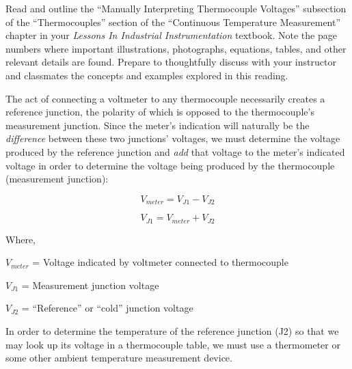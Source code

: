 

Read and outline the ``Manually Interpreting Thermocouple Voltages'' subsection of the ``Thermocouples'' section of the ``Continuous Temperature Measurement'' chapter in your {\it Lessons In Industrial Instrumentation} textbook.  Note the page numbers where important illustrations, photographs, equations, tables, and other relevant details are found.  Prepare to thoughtfully discuss with your instructor and classmates the concepts and examples explored in this reading.














The act of connecting a voltmeter to any thermocouple necessarily creates a reference junction, the polarity of which is opposed to the thermocouple's measurement junction.  Since the meter's indication will naturally be the {\it difference} between these two junctions' voltages, we must determine the voltage produced by the reference junction and {\it add} that voltage to the meter's indicated voltage in order to determine the voltage being produced by the thermocouple (measurement junction):

$$V_{meter} = V_{J1} - V_{J2}$$

$$V_{J1} = V_{meter} + V_{J2}$$

\noindent
Where,

$V_{meter}$ = Voltage indicated by voltmeter connected to thermocouple

$V_{J1}$ = Measurement junction voltage

$V_{J2}$ = ``Reference'' or ``cold'' junction voltage

\vskip 10pt

In order to determine the temperature of the reference junction (J2) so that we may look up its voltage in a thermocouple table, we must use a thermometer or some other ambient temperature measurement device.











